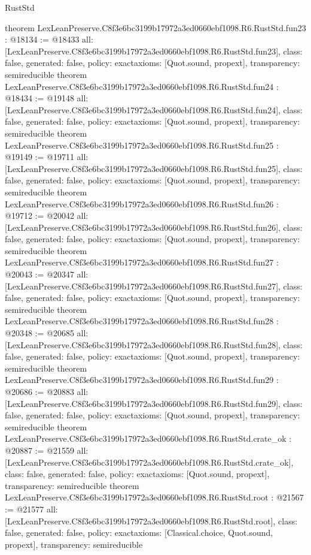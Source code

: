 \begin{lexlean}{RustStd}
\begin{coremodule}
{}
theorem LexLeanPreserve.C8f3e6bc3199b17972a3ed0660ebf1098.R6.RustStd.fun23 : @18134 := @18433 {
  all: [LexLeanPreserve.C8f3e6bc3199b17972a3ed0660ebf1098.R6.RustStd.fun23],
  class: false,
  generated: false,
  policy: exact{axioms: [Quot.sound, propext]},
  transparency: semireducible
}
theorem LexLeanPreserve.C8f3e6bc3199b17972a3ed0660ebf1098.R6.RustStd.fun24 : @18434 := @19148 {
  all: [LexLeanPreserve.C8f3e6bc3199b17972a3ed0660ebf1098.R6.RustStd.fun24],
  class: false,
  generated: false,
  policy: exact{axioms: [Quot.sound, propext]},
  transparency: semireducible
}
theorem LexLeanPreserve.C8f3e6bc3199b17972a3ed0660ebf1098.R6.RustStd.fun25 : @19149 := @19711 {
  all: [LexLeanPreserve.C8f3e6bc3199b17972a3ed0660ebf1098.R6.RustStd.fun25],
  class: false,
  generated: false,
  policy: exact{axioms: [Quot.sound, propext]},
  transparency: semireducible
}
theorem LexLeanPreserve.C8f3e6bc3199b17972a3ed0660ebf1098.R6.RustStd.fun26 : @19712 := @20042 {
  all: [LexLeanPreserve.C8f3e6bc3199b17972a3ed0660ebf1098.R6.RustStd.fun26],
  class: false,
  generated: false,
  policy: exact{axioms: [Quot.sound, propext]},
  transparency: semireducible
}
theorem LexLeanPreserve.C8f3e6bc3199b17972a3ed0660ebf1098.R6.RustStd.fun27 : @20043 := @20347 {
  all: [LexLeanPreserve.C8f3e6bc3199b17972a3ed0660ebf1098.R6.RustStd.fun27],
  class: false,
  generated: false,
  policy: exact{axioms: [Quot.sound, propext]},
  transparency: semireducible
}
theorem LexLeanPreserve.C8f3e6bc3199b17972a3ed0660ebf1098.R6.RustStd.fun28 : @20348 := @20685 {
  all: [LexLeanPreserve.C8f3e6bc3199b17972a3ed0660ebf1098.R6.RustStd.fun28],
  class: false,
  generated: false,
  policy: exact{axioms: [Quot.sound, propext]},
  transparency: semireducible
}
theorem LexLeanPreserve.C8f3e6bc3199b17972a3ed0660ebf1098.R6.RustStd.fun29 : @20686 := @20883 {
  all: [LexLeanPreserve.C8f3e6bc3199b17972a3ed0660ebf1098.R6.RustStd.fun29],
  class: false,
  generated: false,
  policy: exact{axioms: [Quot.sound, propext]},
  transparency: semireducible
}
theorem LexLeanPreserve.C8f3e6bc3199b17972a3ed0660ebf1098.R6.RustStd.crate_ok : @20887 := @21559 {
  all: [LexLeanPreserve.C8f3e6bc3199b17972a3ed0660ebf1098.R6.RustStd.crate_ok],
  class: false,
  generated: false,
  policy: exact{axioms: [Quot.sound, propext]},
  transparency: semireducible
}
theorem LexLeanPreserve.C8f3e6bc3199b17972a3ed0660ebf1098.R6.RustStd.root : @21567 := @21577 {
  all: [LexLeanPreserve.C8f3e6bc3199b17972a3ed0660ebf1098.R6.RustStd.root],
  class: false,
  generated: false,
  policy: exact{axioms: [Classical.choice, Quot.sound, propext]},
  transparency: semireducible
}


\end{coremodule}
\end{lexlean}
